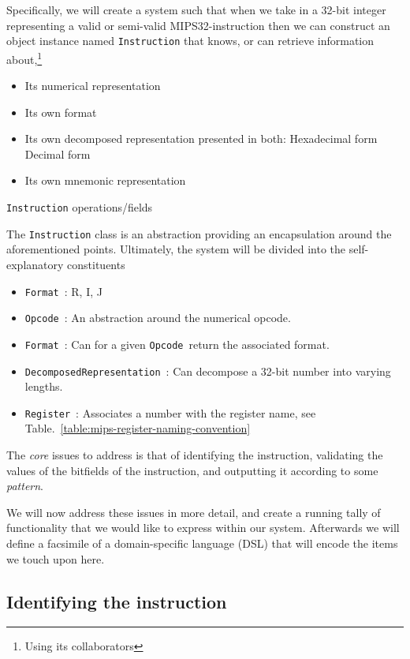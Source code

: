 \documentclass[a4paper]{article}
\newcommand{\opcodem}{\texttt{Opcode}\ }
\newcommand{\formatm}{\texttt{Format}\ }
\newcommand{\decomposedm}{\texttt{DecomposedRepresentation}\ }
\newcommand{\registerm}{\texttt{Register}\ }
\newcommand{\mij}[1]{\texttt{#1}}
\begin{document}
Specifically, we will create a system such that when we take in a
32-bit integer representing a valid or semi-valid MIPS32-instruction
then we can construct an object instance named \mij{Instruction} that
knows, or can retrieve information about,\footnote{Using its
collaborators}

\begin{table}
\begin{itemize}
\item Its numerical representation
\item Its own format
\item Its own decomposed representation presented in both:
\subitem Hexadecimal form
\subitem Decimal form
\item Its own mnemonic representation
\end{itemize}
\caption{\mij{Instruction} operations/fields}
\label{table:instruction-operations}
\end{table}

The \mij{Instruction} class is an abstraction providing an
encapsulation around the aforementioned points. Ultimately, the system
will be divided into the self-explanatory constituents

\begin{itemize}
\item \formatm: R, I, J
\item \opcodem: An abstraction around the numerical opcode.
\item \formatm: Can for a given \opcodem return the associated format.
\item \decomposedm: Can decompose a 32-bit number into varying lengths.
\item \registerm: Associates a number with the register name, 
      see Table.~\ref{table:mips-register-naming-convention}
\end{itemize}

The \emph{core} issues to address is that of identifying the
instruction, validating the values of the bitfields of the
instruction, and outputting it according to some \emph{pattern}.

We will now address these issues in more detail, and create a running
tally of functionality that we would like to express within our
system. Afterwards we will define a facsimile of a domain-specific
language (DSL) that will encode the items we touch upon here.

\subsection{Identifying the instruction}\label{section:identification}
\end{document}
